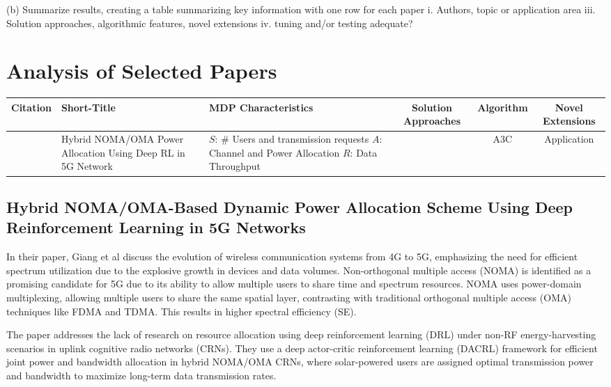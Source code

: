 \documentclass[journal]{IEEEtran}
\begin{document}
(b) Summarize results, creating a table summarizing key information with one row for each paper 
i. Authors, topic or application area
iii. Solution approaches, algorithmic features, novel extensions
iv. tuning and/or testing adequate?



\section{Analysis of Selected Papers}
\label{sec:selected_papers}

\begin{table*}
    \begin{tabularx}{\textwidth}{cX X ccc}
        Citation & Short-Title & MDP Characteristics & Solution Approaches & Algorithm &
        Novel Extensions\\
        \midrule
        \cite{giang2020} & Hybrid NOMA/OMA Power Allocation Using Deep RL in 5G Network & 
        $S$: \# Users and transmission requests \newline
        $A$: Channel and Power Allocation \newline
        $R$: Data Throughput &
        & A3C\cite{mnih2016} & Application
    \end{tabularx}
\end{table*}


\subsection{Hybrid NOMA/OMA-Based Dynamic Power Allocation Scheme 
Using Deep Reinforcement Learning in 5G Networks}

In their paper\cite{giang2020}, Giang et al discuss the evolution of wireless communication systems
from 4G to 5G, emphasizing the need for efficient spectrum utilization due to the explosive growth 
in devices and data volumes. Non-orthogonal multiple access (NOMA) is identified as a promising 
candidate for 5G due to its ability to allow multiple users to share time and spectrum resources.
NOMA uses power-domain multiplexing, allowing multiple users to share the same spatial layer, 
contrasting with traditional orthogonal multiple access (OMA) techniques like FDMA and TDMA. 
This results in higher spectral efficiency (SE).

The paper addresses the lack of research on resource allocation using deep reinforcement learning 
(DRL) under non-RF energy-harvesting scenarios in uplink cognitive radio networks (CRNs).
They use a deep actor-critic reinforcement learning (DACRL) framework for efficient joint power and
bandwidth allocation in hybrid NOMA/OMA CRNs, where solar-powered users are assigned optimal 
transmission power and bandwidth to maximize long-term data transmission rates.
\end{document}
